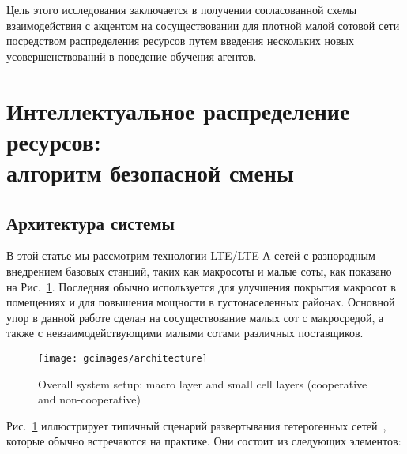 Цель этого исследования заключается в получении согласованной схемы взаимодействия с акцентом на сосуществовании для плотной малой сотовой сети посредством распределения ресурсов путем введения нескольких новых усовершенствований в поведение обучения агентов.

\section{Интеллектуальное распределение ресурсов: \\алгоритм безопасной смены}
\subsection{Архитектура системы}
В этой статье мы рассмотрим технологии LTE/LTE-А сетей с разнородным внедрением базовых станций, таких как макросоты и малые соты, как показано на Рис.~\ref{fig:architecture}. Последняя обычно используется для улучшения покрытия макросот в помещениях и для повышения мощности в густонаселенных районах. Основной упор в данной работе сделан на сосуществование малых сот с макросредой, а также с невзаимодействующими малыми сотами различных поставщиков.

\begin{figure}[]
    \centering
    \texttt{[image: gcimages/architecture]}
    \caption{Overall system setup: macro layer and small cell layers (cooperative and non-cooperative)}
    \label{fig:architecture}
\end{figure}

Рис.~\ref{fig:architecture} иллюстрирует типичный сценарий развертывания гетерогенных сетей~\cite{6824744}, которые обычно встречаются на практике. Они состоит из следующих элементов:

